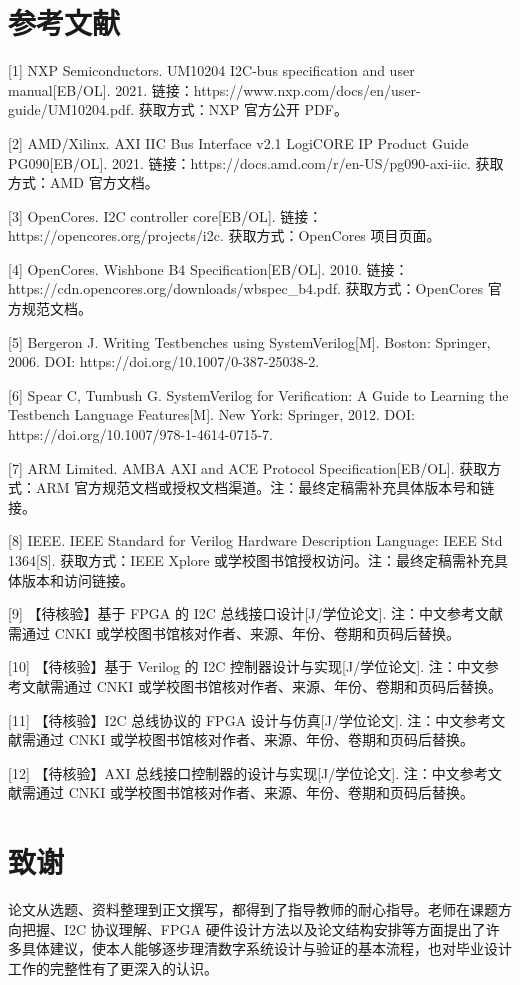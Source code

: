 \documentclass[12pt,a4paper]{article}
\numberwithin{equation}{section}
\begin{document}
\section*{参考文献}
{[}1{]} NXP Semiconductors. UM10204 I2C-bus specification and user
manual{[}EB/OL{]}. 2021.
链接：https://www.nxp.com/docs/en/user-guide/UM10204.pdf. 获取方式：NXP
官方公开 PDF。

{[}2{]} AMD/Xilinx. AXI IIC Bus Interface v2.1 LogiCORE IP Product Guide
PG090{[}EB/OL{]}. 2021.
链接：https://docs.amd.com/r/en-US/pg090-axi-iic. 获取方式：AMD
官方文档。

{[}3{]} OpenCores. I2C controller core{[}EB/OL{]}.
链接：https://opencores.org/projects/i2c. 获取方式：OpenCores 项目页面。

{[}4{]} OpenCores. Wishbone B4 Specification{[}EB/OL{]}. 2010.
链接：https://cdn.opencores.org/downloads/wbspec\_b4.pdf.
获取方式：OpenCores 官方规范文档。

{[}5{]} Bergeron J. Writing Testbenches using SystemVerilog{[}M{]}.
Boston: Springer, 2006. DOI: https://doi.org/10.1007/0-387-25038-2.

{[}6{]} Spear C, Tumbush G. SystemVerilog for Verification: A Guide to
Learning the Testbench Language Features{[}M{]}. New York: Springer,
2012. DOI: https://doi.org/10.1007/978-1-4614-0715-7.

{[}7{]} ARM Limited. AMBA AXI and ACE Protocol Specification{[}EB/OL{]}.
获取方式：ARM
官方规范文档或授权文档渠道。注：最终定稿需补充具体版本号和链接。

{[}8{]} IEEE. IEEE Standard for Verilog Hardware Description Language:
IEEE Std 1364{[}S{]}. 获取方式：IEEE Xplore
或学校图书馆授权访问。注：最终定稿需补充具体版本和访问链接。

{[}9{]} 【待核验】基于 FPGA 的 I2C 总线接口设计{[}J/学位论文{]}.
注：中文参考文献需通过 CNKI
或学校图书馆核对作者、来源、年份、卷期和页码后替换。

{[}10{]} 【待核验】基于 Verilog 的 I2C 控制器设计与实现{[}J/学位论文{]}.
注：中文参考文献需通过 CNKI
或学校图书馆核对作者、来源、年份、卷期和页码后替换。

{[}11{]} 【待核验】I2C 总线协议的 FPGA 设计与仿真{[}J/学位论文{]}.
注：中文参考文献需通过 CNKI
或学校图书馆核对作者、来源、年份、卷期和页码后替换。

{[}12{]} 【待核验】AXI 总线接口控制器的设计与实现{[}J/学位论文{]}.
注：中文参考文献需通过 CNKI
或学校图书馆核对作者、来源、年份、卷期和页码后替换。

\clearpage
\section*{致谢}
论文从选题、资料整理到正文撰写，都得到了指导教师的耐心指导。老师在课题方向把握、I2C
协议理解、FPGA
硬件设计方法以及论文结构安排等方面提出了许多具体建议，使本人能够逐步理清数字系统设计与验证的基本流程，也对毕业设计工作的完整性有了更深入的认识。
\end{document}
